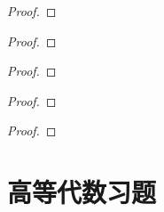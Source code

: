 \documentclass[lang=cn,newtx,10pt,scheme=chinese]{elegantbook}
\begin{document}
\begin{example}
  
\end{example}
\begin{proof}
  
\end{proof}

\begin{example}
  
\end{example}
\begin{proof}
  
\end{proof}

\begin{example}
  
\end{example}
\begin{proof}
  
\end{proof}

\begin{example}
  
\end{example}
\begin{proof}
  
\end{proof}

\begin{example}
  
\end{example}
\begin{proof}
  
\end{proof}







\chapter{高等代数习题}
\end{document}
